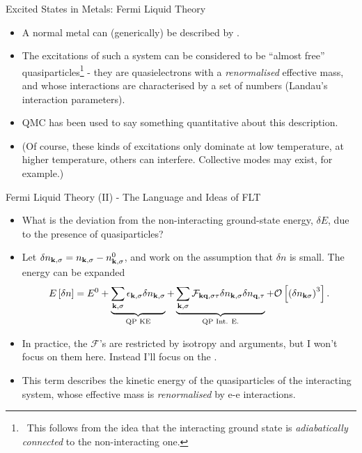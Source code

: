 \documentclass[12pt, pdf, hyperref={draft}, usenames, dvipsnames,
aspectratio=169]{beamer}
\newcommand{\blue}[1]{{\bf\color{NavyBlue}{#1}}}
\newcommand{\green}[1]{{\bf\color{ForestGreen}{#1}}}
\begin{document}
\begin{frame}{Excited States in Metals: Fermi Liquid Theory}
\begin{itemize}
  \item A normal metal can (generically) be described by \blue{Fermi liquid
  theory}.
  \item The excitations of such a system can be considered to be
  ``almost free'' quasiparticles\footnote{\ This follows from the idea that
  the interacting ground state is \textit{adiabatically connected} to the
  non-interacting one.} - they are quasielectrons with a
  \textit{renormalised} effective mass, and whose interactions are
  characterised by a set of numbers (Landau's interaction parameters).
  \item QMC has been used to say something quantitative about this description.
  \item (Of course, these kinds of excitations only dominate at low
  temperature, at higher temperature, others can interfere. Collective
  modes may exist, for example.)
\end{itemize}
\end{frame}


\begin{frame}{Fermi Liquid Theory (II) - The Language and Ideas of FLT}

\begin{itemize}
  \item What is the deviation from the non-interacting ground-state energy,
  $\delta E$, due to the presence of quasiparticles?
  \item Let $\delta n_{\bf k,\sigma} = n_{\bf k,\sigma} - n^{0}_{\bf
  k,\sigma}$, and work on the assumption that $\delta n$ is small. The energy
  can be expanded
  \begin{equation}
    E\left[ \delta n \right]= E^{0} +
    \underbrace{\sum_{\bf k,\sigma} \epsilon_{\bf
    k,\sigma}\delta n_{\bf k,\sigma}}_{\text{QP KE}} +
    \underbrace{\sum_{\bf k,\sigma} \mathcal{F}_{\bf
    k \bf q,\sigma \tau}\delta n_{\bf k,\sigma} \delta n_{\bf
    q,\tau}}_{\text{QP Int. E.}} + \mathcal{O}\left[{(\delta n_{\bf
    k\sigma})}^3\right].
  \end{equation}
  \item In practice, the $\mathcal{F}$'s are restricted by {isotropy} and
  \green{symmetry} arguments, but I won't focus on them here. Instead I'll focus on the
  \blue{quasiparticle kinetic energies}.
  \item This term describes the kinetic energy of the quasiparticles of the
  interacting system, whose effective mass is \textit{renormalised} by
  e-e interactions.
\end{itemize}
\end{frame}
\end{document}

